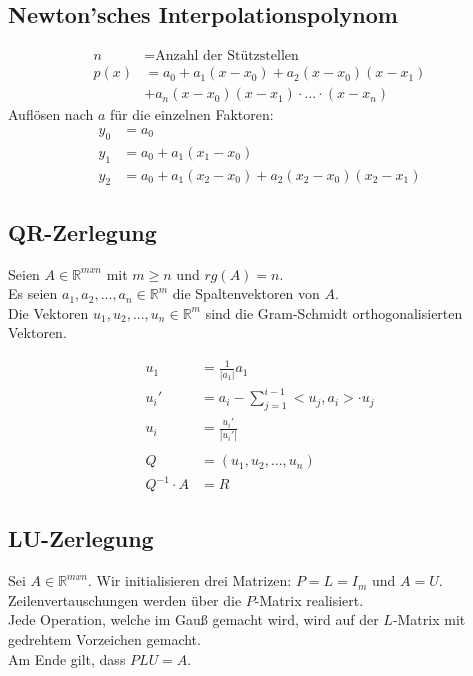 \documentclass[a4paper, 11pt]{article}
\begin{document}
\begin{multicols}{3}
\begin{small}
		\subsection{Newton'sches Interpolationspolynom}
			\begin{align*}
			n &= \text{Anzahl der Stützstellen}\\
			p(x) &= a_0 + a_1(x - x_0) + a_2(x - x_0)(x - x_1)\\
			     &+ a_n(x-x_0)(x - x_1)\cdot ... \cdot (x - x_n)
			\end{align*}
			     Auflösen nach $a$ für die einzelnen Faktoren:
			\begin{align*}
			y_0 &= a_0\\
			y_1 &= a_0 + a_1(x_1 - x_0)	\\
			y_2 &= a_0 + a_1(x_2 - x_0) + a_2(x_2 - x_0)(x_2 - x_1)
			\end{align*}
		\subsection{QR-Zerlegung}
			Seien $A \in \mathbb{R}^{mxn}$ mit $m \ge n$ und $rg(A) = n$.\\
			 Es seien $a_1, a_2, ..., a_n \in \mathbb{R}^m$ die Spaltenvektoren von $A$. \\
			 Die Vektoren $u_1, u_2, ..., u_n \in \mathbb{R}^m$ sind die Gram-Schmidt orthogonalisierten Vektoren.
			 
			 \begin{align*}
			 	u_1 &= \frac{1}{|a_1|} a_1\\
			 	u_i' &= a_i - \sum_{j = 1}^{i-1} <u_j, a_i> \cdot u_j\\
			 	u_i &= \frac{u_i'}{|u_i'|}
			 	\\\\
			 	Q &= (u_1, u_2, ..., u_n)\\
			 	Q^{-1}\cdot A &= R 
			 	\end{align*}
		\subsection{LU-Zerlegung}
			Sei $A \in \mathbb{R}^{mxn}$. Wir initialisieren drei Matrizen: $P = L = I_m$ und $A = U$.\\
			Zeilenvertauschungen werden über die $P$-Matrix realisiert. \\
			Jede Operation, welche im Gauß gemacht wird, wird auf der $L$-Matrix mit gedrehtem Vorzeichen gemacht.\\
			Am Ende gilt, dass $PLU = A$.

\end{small}
\end{multicols}
\end{document}
